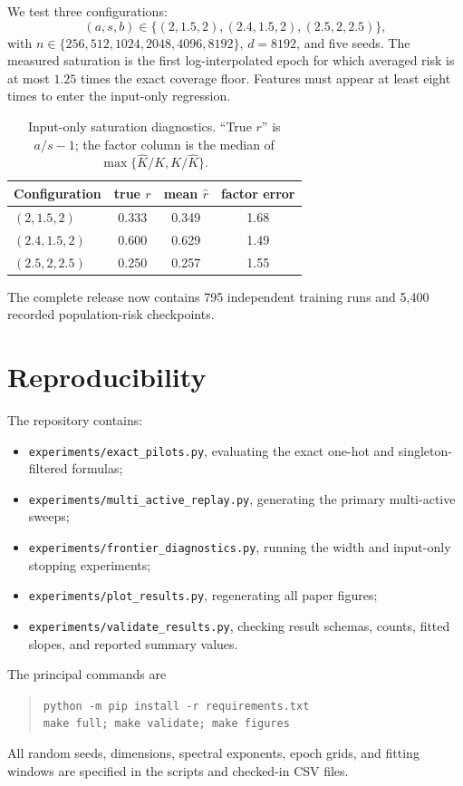 \documentclass[letterpaper]{article}
\newcommand{\1}{\mathbf 1}
\begin{document}
We test three configurations:
\[
(a,s,b)\in\{(2,1.5,2),(2.4,1.5,2),(2.5,2,2.5)\},
\]
with $n\in\{256,512,1024,2048,4096,8192\}$, $d=8192$, and five seeds. The
measured saturation is the first log-interpolated epoch for which averaged risk
is at most $1.25$ times the exact coverage floor. Features must appear at least
eight times to enter the input-only regression.

\begin{table}[t]
\centering
\caption{Input-only saturation diagnostics. ``True $r$'' is $a/s-1$; the
factor column is the median of
$\max\{\widehat K/K,K/\widehat K\}$.}
\begin{tabular}{lccc}
\toprule
Configuration & true $r$ & mean $\widehat r$ & factor error \\
\midrule
$(2,1.5,2)$ & 0.333 & 0.349 & 1.68 \\
$(2.4,1.5,2)$ & 0.600 & 0.629 & 1.49 \\
$(2.5,2,2.5)$ & 0.250 & 0.257 & 1.55 \\
\bottomrule
\end{tabular}
\end{table}

The complete release now contains 795 independent training runs and 5,400
recorded population-risk checkpoints.

\section{Reproducibility}

The repository contains:
\begin{itemize}
\item \texttt{experiments/exact\_pilots.py}, evaluating the exact one-hot and
singleton-filtered formulas;
\item \texttt{experiments/multi\_active\_replay.py}, generating the primary
multi-active sweeps;
\item \texttt{experiments/frontier\_diagnostics.py}, running the width and
input-only stopping experiments;
\item \texttt{experiments/plot\_results.py}, regenerating all paper figures;
\item \texttt{experiments/validate\_results.py}, checking result schemas,
counts, fitted slopes, and reported summary values.
\end{itemize}

The principal commands are
\begin{quote}
\texttt{python -m pip install -r requirements.txt}\\
\texttt{make full; make validate; make figures}\\
\end{quote}
All random seeds, dimensions, spectral exponents, epoch grids, and fitting
windows are specified in the scripts and checked-in CSV files.
\end{document}
